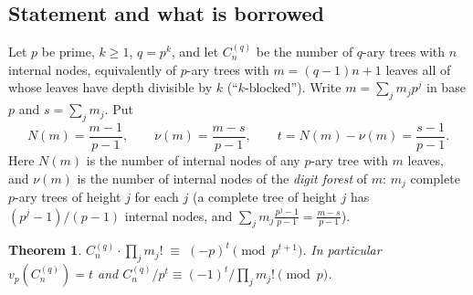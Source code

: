 \documentclass[11pt]{article}
\newtheorem{theorem}{Theorem}[section]
\theoremstyle{definition}
\theoremstyle{remark}
\numberwithin{equation}{section}
\numberwithin{figure}{section}
\newcommand{\C}{C_n^{(q)}}
\begin{document}
\subsection{Statement and what is borrowed}\label{acc:sec:statement}

Let $p$ be prime, $k\ge1$, $q=p^k$, and let $\C$ be the number of $q$-ary trees with $n$
internal nodes, equivalently of $p$-ary trees with $m=(q-1)n+1$ leaves all of whose leaves have
depth divisible by $k$ (``$k$-blocked''). Write $m=\sum_j m_jp^j$ in base $p$ and
$s=\sum_j m_j$. Put
\[
 N(m)=\frac{m-1}{p-1},\qquad \nu(m)=\frac{m-s}{p-1},\qquad t=N(m)-\nu(m)=\frac{s-1}{p-1}.
\]
Here $N(m)$ is the number of internal nodes of any $p$-ary tree with $m$ leaves, and $\nu(m)$
is the number of internal nodes of the \emph{digit forest} of $m$: $m_j$ complete $p$-ary
trees of height $j$ for each $j$ (a complete tree of height $j$ has $(p^j-1)/(p-1)$ internal
nodes, and $\sum_j m_j\frac{p^j-1}{p-1}=\frac{m-s}{p-1}$).

\begin{theorem}\label{acc:thm}
$\displaystyle \C\cdot\prod_j m_j!\;\equiv\;(-p)^{t}\pmod{p^{t+1}}.$
In particular $v_p(\C)=t$ and $\C/p^t\equiv(-1)^t/\prod_jm_j!\pmod p$.
\end{theorem}
\end{document}
